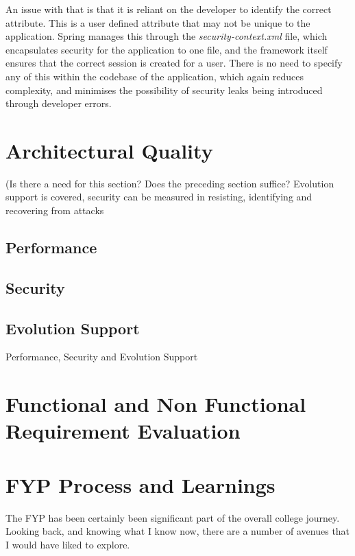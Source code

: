 An issue with that is that it is reliant on the developer to identify the correct attribute. This is a user defined attribute that may not be unique to the application. Spring manages this through the \textit{security-context.xml} file, which encapsulates security for the application to one file, and the framework itself ensures that the correct session is created for a user. There is no need to specify any of this within the codebase of the application, which again reduces complexity, and minimises the possibility of security leaks being introduced through developer errors.

\section{Architectural Quality}

(Is there a need for this section? Does the preceding section suffice? Evolution support is covered, security can be measured in resisting, identifying and recovering from attacks \cite{bass2003software}

\subsection{Performance}

\subsection{Security}

\subsection{Evolution Support}


Performance, Security and Evolution Support

\section{Functional and Non Functional Requirement Evaluation}

\section{FYP Process and Learnings}

The FYP has been certainly been significant part of the overall college journey. Looking back, and knowing what I know now, there are a number of avenues that I would have liked to explore.

